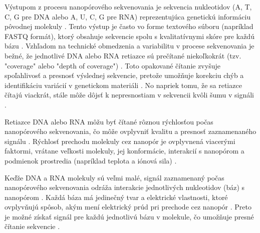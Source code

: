 
Výstupom z procesu nanopórového sekvenovania je sekvencia nukleotidov (A, T, C, G pre DNA alebo A, U, C, G pre RNA) reprezentujúca genetickú informáciu pôvodnej molekuly \cite{Zheng2023Nanopore}.
Tento výstup je často vo forme textového súboru (napríklad FASTQ formát), ktorý obsahuje sekvencie spolu s kvalitatívnymi skóre pre každú bázu \cite{Zheng2023Nanopore}.
Vzhľadom na technické obmedzenia a variabilitu v procese sekvenovania je bežné, že jednotlivé DNA alebo RNA retiazce sú prečítané niekoľkokrát (tzv. "coverage" alebo "depth of coverage") \cite{Zheng2023Nanopore}.
Toto opakované čítanie zvyšuje spoľahlivosť a presnosť výslednej sekvencie, pretože umožňuje korekciu chýb a identifikáciu variácií v genetickom materiáli \cite{Zheng2023Nanopore,Lopez2019DNA}.
No napriek tomu, že sa retiazce čítajú viackrát, stále môže dôjsť k nepresnostiam v sekvencii kvôli šumu v signáli \cite{Zheng2023Nanopore}.





Retiazce DNA alebo RNA môžu byť čítané rôznou rýchlosťou počas nanopórového sekvenovania, čo môže ovplyvniť kvalitu a presnosť zaznamenaného signálu \cite{Zheng2023Nanopore}.
Rýchlosť prechodu molekuly cez nanopór je ovplyvnená viacerými faktormi, vrátane veľkosti molekuly, jej konformácie, interakcií s nanopórom a podmienok prostredia (napríklad teplota a iónová sila) \cite{Zheng2023Nanopore}.


Keďže DNA a RNA molekuly sú veľmi malé, signál zaznamenaný počas nanopórového sekvenovania odráža interakcie jednotlivých nukleotidov (báz) s nanopórom \cite{Zheng2023Nanopore}.
Každá báza má jedinečný tvar a elektrické vlastnosti, ktoré ovplyvňujú spôsob, akým mení elektrický prúd pri prechode cez nanopór \cite{Zheng2023Nanopore}.
Preto je možné získať signál pre každú jednotlivú bázu v molekule, čo umožňuje presné čítanie sekvencie \cite{Zheng2023Nanopore}.